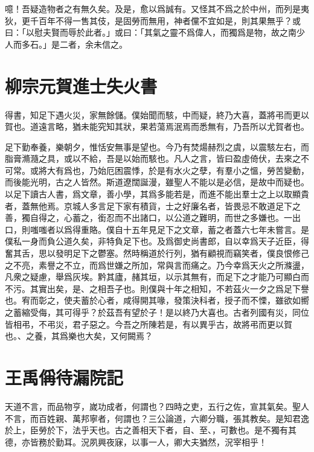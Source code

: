 噫！吾疑造物者之有無久矣。及是，愈以爲誠有。又怪其不爲之於中州，而列是夷狄，更千百年不得一售其伎，是固勞而無用，神者儻不宜如是，則其果無乎？或曰：「以慰夫賢而辱於此者。」或曰：「其氣之靈不爲偉人，而獨爲是物，故之南少人而多石。」是二者，余未信之。

\section[賀進士王參元失火書\quad{\small 柳宗元}]{{\normalsize 柳宗元}\quad 賀進士失火書}
得書，知足下遇火災，家無餘儲。僕始聞而駭，中而疑，終乃大喜，蓋將弔而更以賀也。道遠言略，猶未能究知其狀，果若蕩焉泯焉而悉無有，乃吾所以尤賀者也。

足下勤奉養，樂朝夕，惟恬安無事是望也。今乃有焚煬赫烈之虞，以震駭左右，而脂膏滫瀡之具，或以不給，吾是以始而駭也。凡人之言，皆曰盈虛倚伏，去來之不可常。或將大有爲也，乃始厄困震悸，於是有水火之孽，有羣小之慍，勞苦變動，而後能光明，古之人皆然。斯道遼闊誕漫，雖聖人不能以是必信，是故中而疑也。以足下讀古人書，爲文章，善小學，其爲多能若是，而進不能出羣士之上以取顯貴者，蓋無他焉。京城人多言足下家有積貨，士之好廉名者，皆畏忌不敢道足下之善，獨自得之，心蓄之，銜忍而不出諸口，以公道之難明，而世之多嫌也。一出口，則嗤嗤者以爲得重賂。僕自十五年見足下之文章，蓄之者蓋六七年未嘗言。是僕私一身而負公道久矣，非特負足下也。及爲御史尚書郎，自以幸爲天子近臣，得奮其舌，思以發明足下之鬱塞。然時稱道於行列，猶有顧視而竊笑者，僕良恨修己之不亮，素譽之不立，而爲世嫌之所加，常與言而痛之。乃今幸爲天火之所滌盪，凡衆之疑慮，舉爲灰埃。黔其廬，赭其垣，以示其無有，而足下之才能乃可顯白而不污。其實出矣，是、之相吾子也。則僕與十年之相知，不若茲火一夕之爲足下譽也。宥而彰之，使夫蓄於心者，咸得開其喙，發策決科者，授子而不慄，雖欲如嚮之蓄縮受侮，其可得乎？於茲吾有望於子！是以終乃大喜也。古者列國有災，同位皆相弔，不弔災，君子惡之。今吾之所陳若是，有以異乎古，故將弔而更以賀也。、之養，其爲樂也大矣，又何闕焉？

\section[待漏院記\quad{\small 王禹偁}]{{\normalsize 王禹偁}\quad 待漏院記}
天道不言，而品物亨，嵗功成者，何謂也？四時之吏，五行之佐，宣其氣矣。聖人不言，而百姓親、萬邦寧者，何謂也？三公論道，六卿分職，張其教矣。是知君逸於上，臣勞於下，法乎天也。古之善相天下者，自、至、，可數也。是不獨有其德，亦皆務於勤耳。況夙興夜寐，以事一人，卿大夫猶然，況宰相乎！

